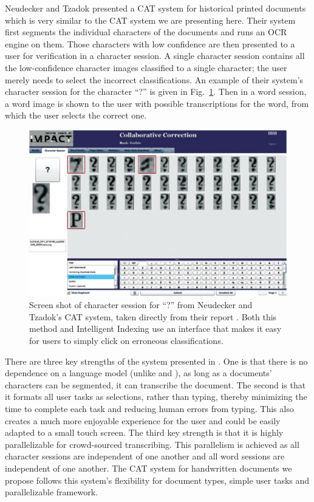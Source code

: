 \documentclass[conference]{IEEEtran}
\begin{document}
Neudecker and Tzadok\cite{Neudecker2010} presented a CAT system for historical printed documents which is very similar to the CAT system we are presenting here. Their system first segments the individual characters of the documents and runs an OCR engine on them. Those characters with low confidence are then presented to a user for verification in a character session. A single character session contains all the low-confidence character images classified to a single character; the user merely needs to select the incorrect classifications.
An example of their system's character session for the character ``?'' is given in Fig.~\ref{fig:carpet}. 
Then in a word session, a word image is shown to the user with possible transcriptions for the word, from which the user selects the correct one.

\begin{figure}
    \centering
    \includegraphics[width=.47\textwidth]{carpet}
    \caption{Screen shot of character session for ``?'' from Neudecker and Tzadok's CAT system, taken directly from their report \cite{Neudecker2010}. Both this method and Intelligent Indexing use an interface that makes it easy for users to simply click on erroneous classifications.}
    \label{fig:carpet}
\end{figure}

There are three key strengths of the system presented in \cite{Neudecker2010}. One is that there is no dependence on a language model (unlike \cite{Toselli2010} and \cite{Serrano2014}), as long as a documents' characters can be segmented, it can transcribe the document. The second is that it formats all user tasks as selections, rather than typing, thereby minimizing the time to complete each task and reducing human errors from typing. This also creates a much more enjoyable experience for the user and could be easily adapted to a small touch screen. The third key strength is that it is highly parallelizable for crowd-sourced transcribing. This parallelism is achieved as all character sessions are independent of one another and all word sessions are independent of one another. The CAT system for handwritten documents we propose follows this system's flexibility for document types, simple user tasks and parallelizable framework.
\end{document}
